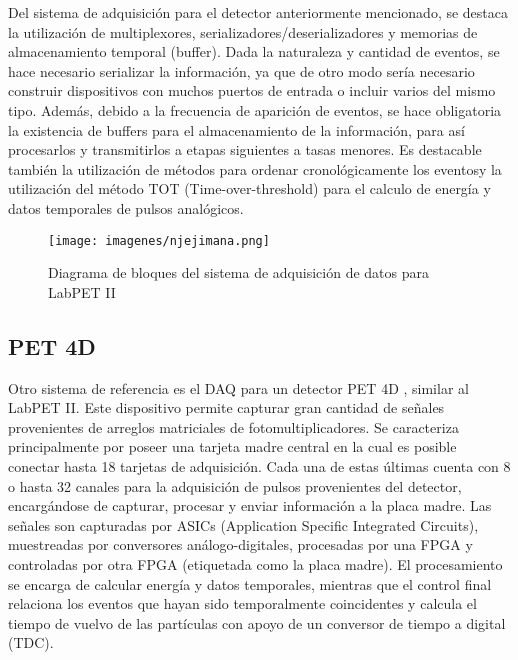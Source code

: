 \par Del sistema de adquisición para el detector anteriormente mencionado, se destaca la utilización de multiplexores, serializadores/deserializadores y memorias de almacenamiento temporal (buffer). Dada la naturaleza y cantidad de eventos, se hace necesario serializar la información, ya que de otro modo sería necesario construir dispositivos con muchos puertos de entrada o incluir varios del mismo tipo. Además, debido a la frecuencia de aparición de eventos, se hace obligatoria la existencia de buffers para el almacenamiento de la información, para así procesarlos y transmitirlos a etapas siguientes a tasas menores. Es destacable también la utilización de métodos para ordenar cronológicamente los eventosy la utilización del método TOT (Time-over-threshold) para el calculo de energía y datos temporales de pulsos analógicos. 


\begin{figure}[H]
	\centering
	\texttt{[image: imagenes/njejimana.png]}
	\caption{Diagrama de bloques del sistema de adquisición de datos para LabPET II \cite{Njejimana2013DesignImaging}}
	\label{fig:njejimana}
\end{figure}

\newpage
\subsection{PET 4D}

\par Otro sistema de referencia es el DAQ para un detector PET 4D \cite{Marcatili2011DevelopmentDetector}, similar al LabPET II. Este dispositivo permite capturar gran cantidad de señales provenientes de arreglos matriciales de fotomultiplicadores. Se caracteriza principalmente por poseer una tarjeta madre central en la cual es posible conectar hasta 18 tarjetas de adquisición. Cada una de estas últimas cuenta con 8 o hasta 32 canales para la adquisición de pulsos provenientes del detector, encargándose de capturar, procesar y enviar información a la placa madre.
Las señales son capturadas por ASICs (Application Specific Integrated Circuits), muestreadas por conversores análogo-digitales, procesadas por una FPGA y controladas por otra FPGA (etiquetada como la placa madre). El procesamiento se encarga de calcular energía y datos temporales, mientras que el control final relaciona los eventos que hayan sido temporalmente coincidentes y calcula el tiempo de vuelvo de las partículas con apoyo de un conversor de tiempo a digital (TDC).

